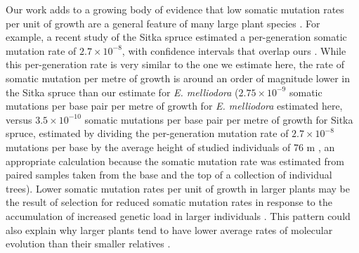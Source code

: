 Our work adds to a growing body of evidence that low somatic mutation rates per unit of growth are a general feature of many large plant species \parencite{plomion_oak_2018, schmid-siegert_low_2017, hanlon_somatic_2019, wang_architecture_2019, bobiwash_somatic_2013}. For example, a recent study of the Sitka spruce estimated a per-generation somatic mutation rate of $2.7 \times 10^{-8}$, with confidence intervals that overlap ours \parencite{hanlon_somatic_2019}. While this per-generation rate is very similar to the one we estimate here, the rate of somatic mutation per metre of growth is around an order of magnitude lower in the Sitka spruce than our estimate for \textit{E. melliodora} ($2.75 \times 10^{-9}$ somatic mutations per base pair per metre of growth for \textit{E. melliodora} estimated here, versus $3.5 \times 10^{-10}$ somatic mutations per base pair per metre of growth for Sitka spruce, estimated by dividing the per-generation mutation rate of $2.7 \times 10^{-8}$ mutations per base by the average height of studied individuals of 76 m \parencite{hanlon_somatic_2019}, an appropriate calculation because the somatic mutation rate was estimated from paired samples taken from the base and the top of a collection of individual trees). Lower somatic mutation rates per unit of growth in larger plants may be the result of selection for reduced somatic mutation rates in response to the accumulation of increased genetic load in larger individuals \parencite{plomion_oak_2018, schmid-siegert_low_2017, lanfear_taller_2013, hanlon_somatic_2019, zhong_two_2014, klekowski_mutation_1988, scofield_definitive_2014}. This pattern could also explain why larger plants tend to have lower average rates of molecular evolution than their smaller relatives \parencite{lanfear_taller_2013, smith_rates_2008}.

